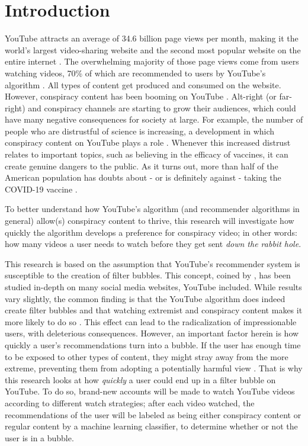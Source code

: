 \documentclass[../main.tex]{subfiles}
\begin{document}
\section{Introduction}
YouTube attracts an average of 34.6 billion page views per month, making it the world's largest
video-sharing website and the second most popular website on the entire internet \citep{neufeld_2021}. The
overwhelming majority of those page views come from users watching videos, 70\% of which are recommended
to users by YouTube's algorithm \citep{cooper_2020}. All types of content get produced and consumed on
the website. However, conspiracy content has been booming on YouTube \citep{donzelli2018misinformation}.
Alt-right (or far-right) and conspiracy channels are starting to grow their audiences, which could have
many negative consequences for society at large. For example, the number of people who are distrustful
of science is increasing, a development in which conspiracy content on YouTube plays a role
\citep{tufekci2018youtube}. Whenever this increased distrust relates to important topics, such as believing in the
efficacy of vaccines, it can create genuine dangers to the public. As it turns out, more than half of the American
population has doubts about - or is definitely against - taking the COVID-19 vaccine \citep{rosenbaum2021escaping}. 

To better understand how YouTube's algorithm (and recommender algorithms in general) allow(s) conspiracy
content to thrive, this research will investigate how quickly the algorithm develops a preference for 
conspiracy video; in other words: how many videos a user needs to watch before they get sent 
\textit{down the rabbit hole}. 

This research is based on the assumption that YouTube's recommender system is susceptible to the creation of 
filter bubbles. This concept, coined by \citet{pariser2011filter}, has been studied in-depth on many social 
media websites, YouTube included. While results vary slightly, the common finding is that the YouTube algorithm
does indeed create filter bubbles and that watching extremist and conspiracy content makes it more likely to do so
\citep{bryant2020youtube, o2013extreme, ledwich2020algorithmic}. This effect can lead to the 
radicalization of impressionable users, with deleterious consequences. However, an important factor herein is
how quickly a user's recommendations turn into a bubble. If the user has enough time to be exposed to other 
types of content, they might stray away from the more extreme, preventing them from adopting a potentially 
harmful view \citep{bozdag2015breaking}. That is why this research looks at how \textit{quickly} a user could
end up in a filter bubble on YouTube. To do so, brand-new accounts will be made to watch YouTube videos 
according to different watch strategies; after each video watched, the recommendations of the user will be 
labeled as being either conspiracy content or regular content by a machine learning classifier, to determine 
whether or not the user is in a bubble. 
\end{document}
